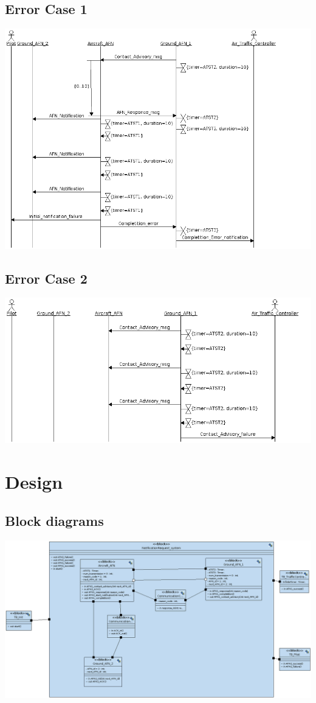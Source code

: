 \documentclass{article}
\begin{document}
\subsection{Error Case 1}
\includegraphics[width=\textwidth]{./lab2_13.png}

\subsection{Error Case 2}
\includegraphics[width=\textwidth]{./lab2_14.png}

\section{Design}

\subsection{Block diagrams}
\includegraphics[width=\textwidth]{./lab2_00.png}
\end{document}
